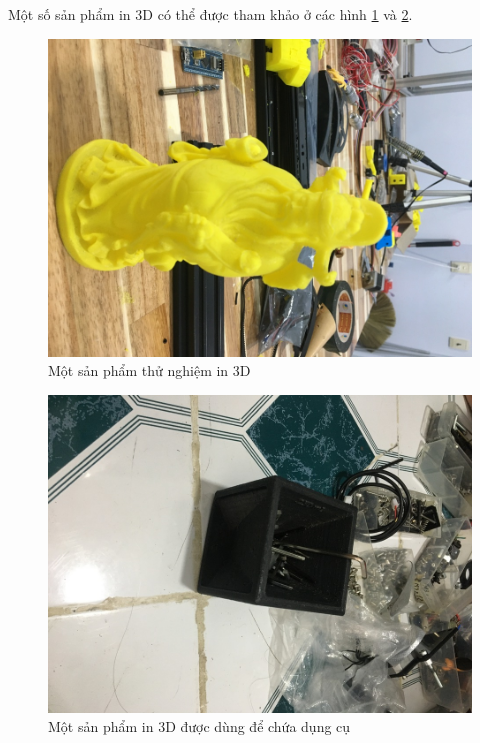 Một số sản phẩm in 3D có thể được tham khảo ở các hình \ref{img:3d_print_prod1} và \ref{img:3d_print_prod2}.

\begin{figure}[!ht]
\centering
\includegraphics[scale=0.3]{images/img_0371_resized.jpg}
\caption{Một sản phẩm thử nghiệm in 3D}
\label{img:3d_print_prod1}
\end{figure}

\begin{figure}[!ht]
\centering
\includegraphics[scale=0.3]{images/img_0370_resized.jpg}
\caption{Một sản phẩm in 3D được dùng để chứa dụng cụ}
\label{img:3d_print_prod2}
\end{figure}

